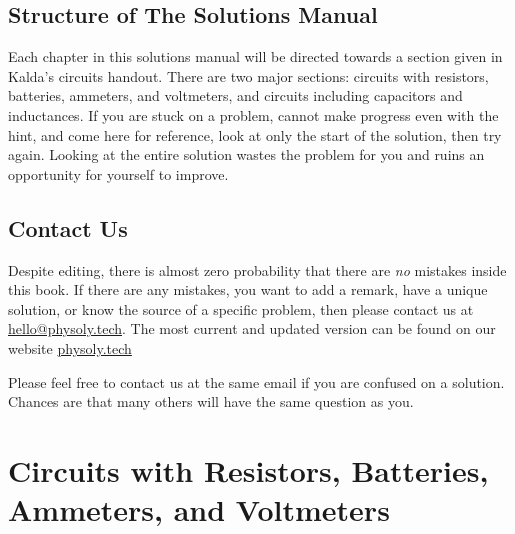 \documentclass[11pt]{article}
\begin{document}
\subsection*{Structure of The Solutions Manual}
\vspace{-5mm}
Each chapter in this solutions manual will be directed towards a section given in Kalda's circuits handout. There are two major sections: circuits with resistors, batteries, ammeters, and voltmeters, and circuits including capacitors and inductances. If you are stuck on a problem, cannot make progress even with the hint, and come here for reference, look at only the start of the solution, then try again. Looking at the entire solution wastes the problem for you and ruins an opportunity for yourself to improve.

\subsection*{Contact Us}
\vspace{-5mm}
Despite editing, there is almost zero probability that there are \textit{no} mistakes inside this book. If there are any mistakes, you want to add a remark, have a unique solution, or know the source of a specific problem, then please contact us at \url{hello@physoly.tech}. The most current and updated version can be found on our website \url{physoly.tech}

Please feel free to contact us at the same email if you are confused on a solution. Chances are that many others will have the same question as you.

\newpage
\section{Circuits with Resistors, Batteries, Ammeters, and Voltmeters}
\vspace{-5mm}
























































\end{document}
